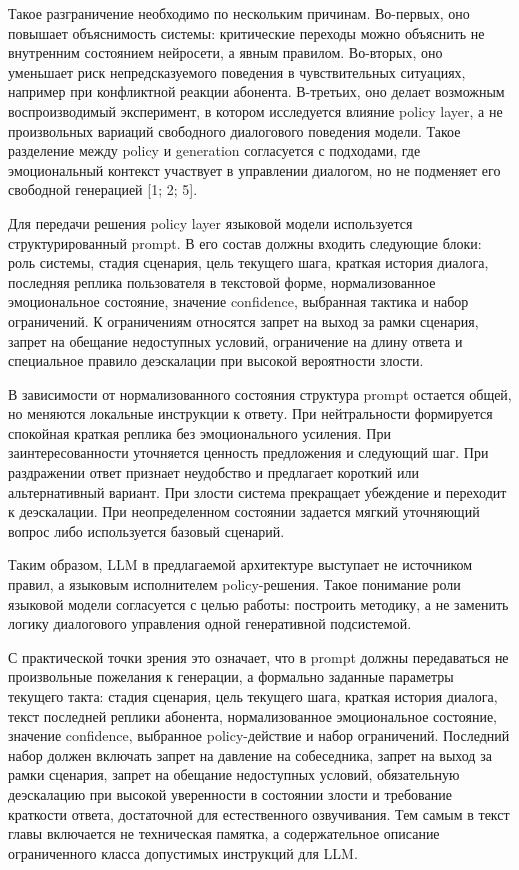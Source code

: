 \documentclass[a4paper,14pt]{extarticle}
\renewcommand{\texttt}[1]{\textnormal{#1}}
\begin{document}
Такое разграничение необходимо по нескольким причинам. Во-первых, оно
повышает объяснимость системы: критические переходы можно объяснить не
внутренним состоянием нейросети, а явным правилом. Во-вторых, оно
уменьшает риск непредсказуемого поведения в чувствительных ситуациях,
например при конфликтной реакции абонента. В-третьих, оно делает
возможным воспроизводимый эксперимент, в котором исследуется влияние
policy layer, а не произвольных вариаций свободного диалогового
поведения модели. Такое разделение между policy и generation согласуется
с подходами, где эмоциональный контекст участвует в управлении диалогом,
но не подменяет его свободной генерацией {[}1; 2; 5{]}.

Для передачи решения policy layer языковой модели используется
структурированный prompt. В его состав должны входить следующие блоки:
роль системы, стадия сценария, цель текущего шага, краткая история
диалога, последняя реплика пользователя в текстовой форме,
нормализованное эмоциональное состояние, значение \texttt{confidence},
выбранная тактика и набор ограничений. К ограничениям относятся запрет
на выход за рамки сценария, запрет на обещание недоступных условий,
ограничение на длину ответа и специальное правило деэскалации при
высокой вероятности злости.

В зависимости от нормализованного состояния структура prompt остается
общей, но меняются локальные инструкции к ответу. При нейтральности
формируется спокойная краткая реплика без эмоционального усиления. При
заинтересованности уточняется ценность предложения и следующий шаг. При
раздражении ответ признает неудобство и предлагает короткий или
альтернативный вариант. При злости система прекращает убеждение и
переходит к деэскалации. При неопределенном состоянии задается мягкий
уточняющий вопрос либо используется базовый сценарий.

Таким образом, \texttt{LLM} в предлагаемой архитектуре выступает не
источником правил, а языковым исполнителем policy-решения. Такое
понимание роли языковой модели согласуется с целью работы: построить
методику, а не заменить логику диалогового управления одной генеративной
подсистемой.

С практической точки зрения это означает, что в prompt должны
передаваться не произвольные пожелания к генерации, а формально заданные
параметры текущего такта: стадия сценария, цель текущего шага, краткая
история диалога, текст последней реплики абонента, нормализованное
эмоциональное состояние, значение \texttt{confidence}, выбранное
policy-действие и набор ограничений. Последний набор должен включать
запрет на давление на собеседника, запрет на выход за рамки сценария,
запрет на обещание недоступных условий, обязательную деэскалацию при
высокой уверенности в состоянии злости и требование краткости ответа,
достаточной для естественного озвучивания. Тем самым в текст главы
включается не техническая памятка, а содержательное описание
ограниченного класса допустимых инструкций для \texttt{LLM}.
\end{document}
